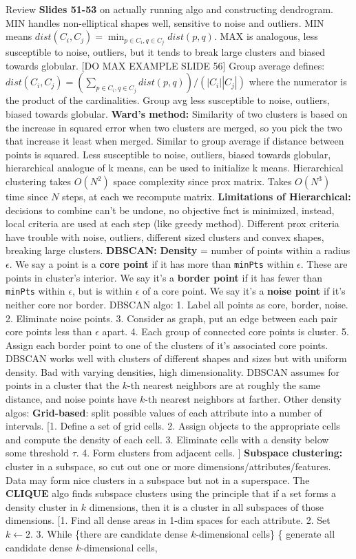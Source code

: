 \documentclass{amsbook}
\theoremstyle{plain}
\theoremstyle{definition}
\theoremstyle{remark}
\begin{document}
Review \textbf{Slides 51-53} on actually running algo and constructing dendrogram. MIN handles non-elliptical shapes well, sensitive to noise and outliers. MIN means $dist(C_i,C_j) = \min_{p\in C_i,q \in C_j}dist(p,q)$. MAX is analogous, less susceptible to noise, outliers, but it tends to break large clusters and biased towards globular. [DO MAX EXAMPLE SLIDE 56] Group average defines: $dist(C_i,C_j) = (\sum_{p\in C_i,q \in C_j}dist(p,q))/(|C_i||C_j|)$ where the numerator is the product of the cardinalities. Group avg less susceptible to noise, outliers, biased towards globular. \textbf{Ward's method: } Similarity of two clusters is based on the increase in squared error when two clusters are merged, so you pick the two that increase it least when merged. Similar to group average if distance between points is squared. Less susceptible to noise, outliers, biased towards globular, hierarchical analogue of k means, can be used to initialize k means. Hierarchical clustering takes $O(N^2)$ space complexity since prox matrix. Takes $O(N^3)$ time since $N$ steps, at each we recompute matrix. \textbf{Limitations of Hierarchical: }decisions to combine can't be undone, no objective fnct is minimized, instead, local criteria are used at each step (like greedy method). Different prox criteria have trouble with noise, outliers, different sized clusters and convex shapes, breaking large clusters. \textbf{DBSCAN: } \textbf{Density} = number of points within a radius $\epsilon$. We say a point is a \textbf{core point} if it has more than \texttt{minPts} within $\epsilon$. These are points in cluster's interior. We say it's a \textbf{border point} if it has fewer than \texttt{minPts} within $\epsilon$, but is within $\epsilon$ of a core point. We say it's a \textbf{noise point} if it's neither core nor border. DBSCAN algo: 1. Label all points as core, border, noise. 2. Eliminate noise points. 3. Consider as graph, put an edge between each pair core points less than $\epsilon$ apart. 4. Each group of connected core points is cluster. 5. Assign each border point to one of the clusters of it's associated core points. DBSCAN works well with clusters of different shapes and sizes but with uniform density. Bad with varying densities, high dimensionality. DBSCAN assumes for points in a cluster that the $k$-th nearest neighbors are at roughly the same distance, and noise points have $k$-th nearest neighbors at farther. Other density algos: \textbf{Grid-based}: split possible values of each attribute into a number of intervals.  [1. Define a set of grid cells. 2. Assign objects to the appropriate cells and compute the density of each cell. 3. Eliminate cells with a density below some threshold $\tau$.  4. Form clusters from adjacent cells. ] \textbf{Subspace clustering: }cluster in a subspace, so cut out one or more dimensions/attributes/features. Data may form nice clusters in a subspace but not in a superspace. The \textbf{CLIQUE} algo finds subspace clusters using the principle that if a set forms a density cluster in $k$ dimensions, then it is a cluster in all subspaces of those dimensions. [1. Find all dense areas in 1-dim spaces for each attribute. 2. Set $k \longleftarrow 2$. 3. While \{there are candidate dense $k$-dimensional cells\} \{ generate all candidate dense $k$-dimensional cells, 
\end{document}
